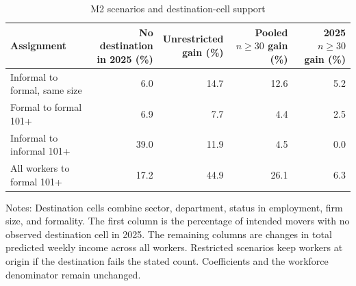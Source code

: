 \begin{table}[htbp]
\centering\small
\caption{M2 scenarios and destination-cell support}
\label{tab:income-counterfactual-support}
\begin{tabular}{p{}rrrr}
\toprule
Assignment & \shortstack{No destination\\in 2025 (\%)} & \shortstack{Unrestricted\\gain (\%)} & \shortstack{Pooled\\$n\geq30$\\gain (\%)} & \shortstack{2025\\$n\geq30$\\gain (\%)} \\
\midrule
Informal to formal, same size & 6.0 & 14.7 & 12.6 & 5.2 \\
Formal to formal 101+ & 6.9 & 7.7 & 4.4 & 2.5 \\
Informal to informal 101+ & 39.0 & 11.9 & 4.5 & 0.0 \\
All workers to formal 101+ & 17.2 & 44.9 & 26.1 & 6.3 \\
\bottomrule
\end{tabular}
\par\vspace{0.3em}
\begin{minipage}{0.97\textwidth}\footnotesize
Notes: Destination cells combine sector, department, status in employment, firm size, and formality. The first column is the percentage of intended movers with no observed destination cell in 2025. The remaining columns are changes in total predicted weekly income across all workers. Restricted scenarios keep workers at origin if the destination fails the stated count. Coefficients and the workforce denominator remain unchanged.
\end{minipage}
\end{table}

